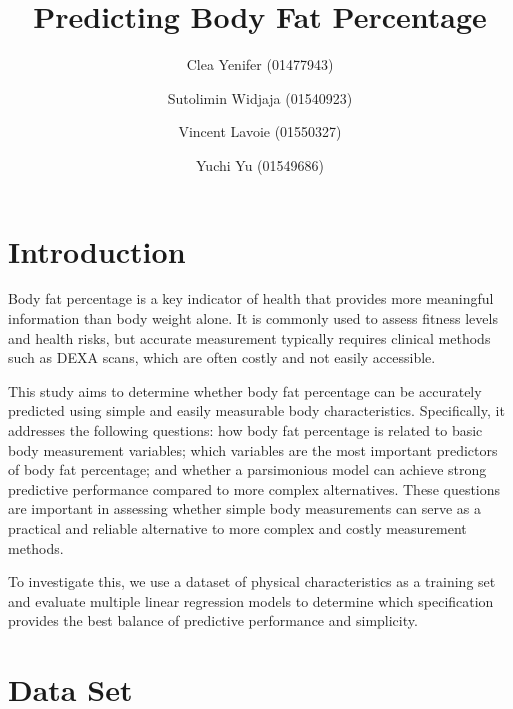 \documentclass[letterpaper,9pt,twocolumn,twoside,]{pinp}
\title{Predicting Body Fat Percentage}
\author[]{Clea Yenifer (01477943)}
\author[]{Sutolimin Widjaja (01540923)}
\author[]{Vincent Lavoie (01550327)}
\author[]{Yuchi Yu (01549686)}
\affil[]{Singapore Management University}
\begin{document}
\verticaladjustment{-2pt}

\maketitle
\thispagestyle{firststyle}



\section{Introduction}\label{introduction}

Body fat percentage is a key indicator of health that provides more
meaningful information than body weight alone. It is commonly used to
assess fitness levels and health risks, but accurate measurement
typically requires clinical methods such as DEXA scans, which are often
costly and not easily accessible.

This study aims to determine whether body fat percentage can be
accurately predicted using simple and easily measurable body
characteristics. Specifically, it addresses the following questions: how
body fat percentage is related to basic body measurement variables;
which variables are the most important predictors of body fat
percentage; and whether a parsimonious model can achieve strong
predictive performance compared to more complex alternatives. These
questions are important in assessing whether simple body measurements
can serve as a practical and reliable alternative to more complex and
costly measurement methods.

To investigate this, we use a dataset of physical characteristics as a
training set and evaluate multiple linear regression models to determine
which specification provides the best balance of predictive performance
and simplicity.

\section{Data Set}\label{data-set}
\end{document}
